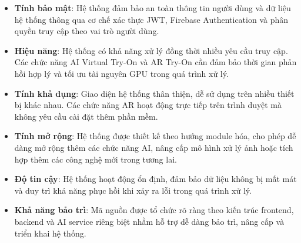 \begin{itemize}

    \item \textbf{Tính bảo mật}: 
    Hệ thống đảm bảo an toàn thông tin người dùng và dữ liệu hệ thống thông qua cơ chế xác thực JWT, Firebase Authentication và phân quyền truy cập theo vai trò người dùng.

    \item \textbf{Hiệu năng}: 
    Hệ thống có khả năng xử lý đồng thời nhiều yêu cầu truy cập. Các chức năng AI Virtual Try-On và AR Try-On cần đảm bảo thời gian phản hồi hợp lý và tối ưu tài nguyên GPU trong quá trình xử lý.

    \item \textbf{Tính khả dụng}: 
    Giao diện hệ thống thân thiện, dễ sử dụng trên nhiều thiết bị khác nhau. Các chức năng AR hoạt động trực tiếp trên trình duyệt mà không yêu cầu cài đặt thêm phần mềm.

    \item \textbf{Tính mở rộng}: 
    Hệ thống được thiết kế theo hướng module hóa, cho phép dễ dàng mở rộng thêm các chức năng AI, nâng cấp mô hình xử lý ảnh hoặc tích hợp thêm các công nghệ mới trong tương lai.

    \item \textbf{Độ tin cậy}: 
    Hệ thống hoạt động ổn định, đảm bảo dữ liệu không bị mất mát và duy trì khả năng phục hồi khi xảy ra lỗi trong quá trình xử lý.

    \item \textbf{Khả năng bảo trì}: 
    Mã nguồn được tổ chức rõ ràng theo kiến trúc frontend, backend và AI service riêng biệt nhằm hỗ trợ dễ dàng bảo trì, nâng cấp và triển khai hệ thống.

\end{itemize}